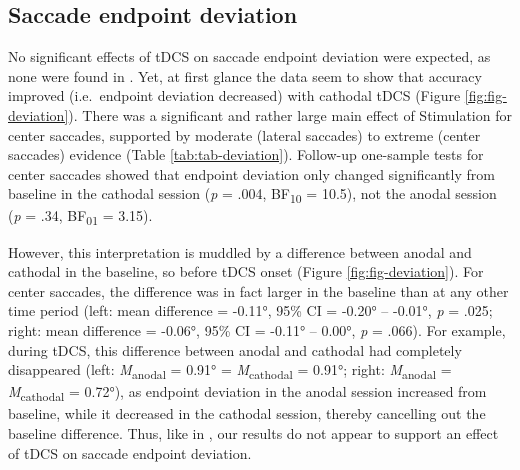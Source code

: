 \documentclass[11pt,english,]{memoir}
\begin{document}
\hypertarget{saccade-endpoint-deviation}{%
\subsection{Saccade endpoint deviation}\label{saccade-endpoint-deviation}}

No significant effects of tDCS on saccade endpoint deviation were expected, as none were found in \textcite{Kanai2012}. Yet, at first glance the data seem to show that accuracy improved (i.e.~endpoint deviation decreased) with cathodal tDCS (Figure \ref{fig:fig-deviation}). There was a significant and rather large main effect of Stimulation for center saccades, supported by moderate (lateral saccades) to extreme (center saccades) evidence (Table \ref{tab:tab-deviation}). Follow-up one-sample tests for center saccades showed that endpoint deviation only changed significantly from baseline in the cathodal session (\emph{p} = .004, BF\textsubscript{10} = 10.5), not the anodal session (\emph{p} = .34, BF\textsubscript{01} = 3.15).

However, this interpretation is muddled by a difference between anodal and cathodal in the baseline, so before tDCS onset (Figure \ref{fig:fig-deviation}). For center saccades, the difference was in fact larger in the baseline than at any other time period (left: mean difference = -0.11°, 95\% CI = -0.20° -- -0.01°, \emph{p} = .025; right: mean difference = -0.06°, 95\% CI = -0.11° -- 0.00°, \emph{p} = .066). For example, during tDCS, this difference between anodal and cathodal had completely disappeared (left: \emph{M}\textsubscript{anodal} = 0.91° = \emph{M}\textsubscript{cathodal} = 0.91°; right: \emph{M}\textsubscript{anodal} = \emph{M}\textsubscript{cathodal} = 0.72°), as endpoint deviation in the anodal session increased from baseline, while it decreased in the cathodal session, thereby cancelling out the baseline difference. Thus, like in \textcite{Kanai2012}, our results do not appear to support an effect of tDCS on saccade endpoint deviation.
\end{document}
